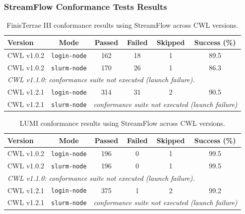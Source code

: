 \documentclass{article}
\begin{document}


\clearpage
\subsubsection*{StreamFlow Conformance Tests Results}
\begin{table}[ht!]
\centering
\renewcommand{\arraystretch}{1.2}
\setlength{\tabcolsep}{6pt}
\begin{tabular}{|l|c|c|c|c|c|}
\hline
\rowcolor{lightgray!50}
\textbf{Version} & \textbf{Mode} & \textbf{Passed} & \textbf{Failed} & \textbf{Skipped} & \textbf{Success (\%)} \\
\hline
CWL v1.0.2 & \texttt{login-node} & 162 & 18 & 1 & 89.5 \\ \hline
CWL v1.0.2 & \texttt{slurm-node} & 170 & 26 & 1 & 86.3 \\ \hline
\hline
\multicolumn{6}{|l|}{\textit{CWL v1.1.0: conformance suite not executed (launch failure).}} \\ \hline
\hline
CWL v1.2.1 & \texttt{login-node} & 314 & 31 & 2 & 90.5 \\ \hline
CWL v1.2.1 & \texttt{slurm-node} & \multicolumn{4}{l|}{\textit{conformance suite not executed (launch failure)}} \\ \hline
\hline
\end{tabular}
\caption{FinisTerrae III conformance results using StreamFlow across CWL versions.}
\end{table}

\begin{table}[ht!]
\centering
\renewcommand{\arraystretch}{1.2}
\setlength{\tabcolsep}{6pt}
\begin{tabular}{|l|c|c|c|c|c|}
\hline
\rowcolor{lightgray!50}
\textbf{Version} & \textbf{Mode} & \textbf{Passed} & \textbf{Failed} & \textbf{Skipped} & \textbf{Success (\%)} \\
\hline
CWL v1.0.2 & \texttt{login-node} & 196 & 0 & 1 & 99.5 \\ \hline
CWL v1.0.2 & \texttt{slurm-node} & 196 & 0 & 1 & 99.5 \\ \hline
\hline
\multicolumn{6}{|l|}{\textit{CWL v1.1.0: conformance suite not executed (launch failure).}} \\ \hline
\hline
CWL v1.2.1 & \texttt{login-node} & 375 & 1 & 2 & 99.2 \\ \hline
CWL v1.2.1 & \texttt{slurm-node} & \multicolumn{4}{l|}{\textit{conformance suite not executed (launch failure)}} \\ \hline
\hline
\end{tabular}
\caption{LUMI conformance results using StreamFlow across CWL versions.}
\end{table}
\end{document}
